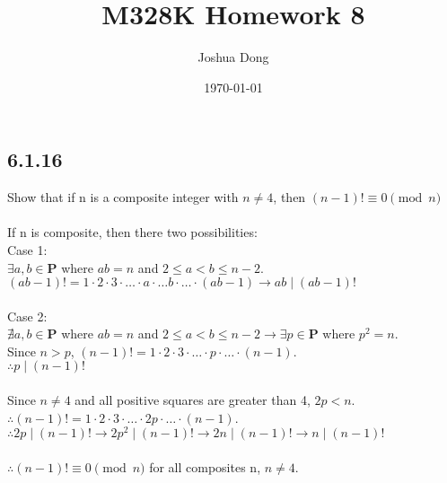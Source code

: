 \documentclass{article}
\begin{document}
\title{M328K\: Homework 8}
\author{Joshua Dong}
\date{\today}
\maketitle

\subsection{6.1.16}
Show that if n is a composite integer with $n \neq 4$,
then $(n-1)! \equiv 0 \pmod{n}$
\\
\\If n is composite, then there two possibilities:
\\Case 1:
\\$\exists a,b \in \textbf{P}$ where $ab = n$ 
and $2 \le a < b \le n-2$.
\\$(ab-1)! =
1\cdot2\cdot3\cdot\ldots\cdot a \cdot\ldots b \cdot\ldots\cdot (ab-1)
\rightarrow ab \mid (ab-1)!$
\\
\\Case 2:
\\$\nexists a,b \in \textbf{P}$ where $ab = n$ and $2 \le a < b \le n-2
\rightarrow \exists p \in \textbf{P}$ where $p^2 = n$.
\\Since $n>p$, $(n-1)! =
1\cdot2\cdot3\cdot\ldots\cdot p \cdot\ldots\cdot (n-1)$.
\\$\therefore p \mid (n-1)!$
\\
\\Since $n \neq 4$ and all positive squares are greater than 4, $2p < n$.
\\$\therefore (n-1)! =
1\cdot2\cdot3\cdot\ldots\cdot 2p \cdot\ldots\cdot (n-1)$.
\\$\therefore 2p \mid (n-1)! \rightarrow
2p^2 \mid (n-1)! \rightarrow
2n \mid (n-1)! \rightarrow
n \mid (n-1)!$
\\
\\$\therefore (n-1)! \equiv 0 \pmod{n}$ for all composites n, $n\neq4$.
\end{document}
